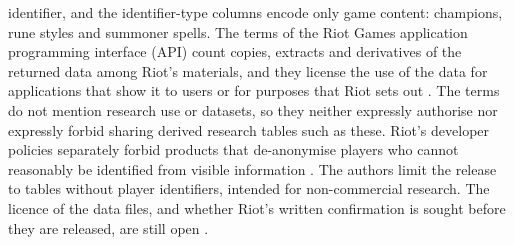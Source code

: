 identifier, and the identifier-type columns encode only game content: champions, rune styles and
summoner spells.
The terms of the Riot Games application programming interface (API) count copies, extracts and
derivatives of the returned data among Riot's materials, and they license the use of the data for
applications that show it to users or for purposes that Riot sets out \cite{riot2013apiterms}. The
terms do not mention research use or datasets, so they neither expressly authorise nor expressly
forbid sharing derived research tables such as these. Riot's developer policies separately forbid
products that de-anonymise players who cannot reasonably be identified from visible information
\cite{riot2025devpolicies}. The authors limit the release to tables without player identifiers,
intended for non-commercial research. The licence of the data files, and whether Riot's written
confirmation is sought before they are released, are still open
.

